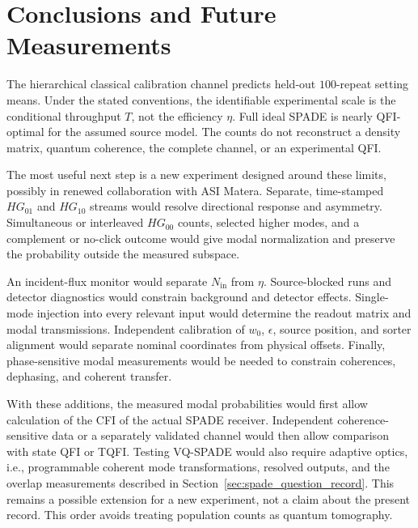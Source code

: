 \section{Conclusions and Future Measurements}
\label{sec:spade_conclusions}

\begin{remark}
    The hierarchical classical calibration channel predicts held-out $100$-repeat setting means.  Under the stated conventions, the identifiable experimental scale is the conditional throughput $T$, not the efficiency $\eta$.  Full ideal SPADE is nearly QFI-optimal for the assumed source model.  The counts do not reconstruct a density matrix, quantum coherence, the complete channel, or an experimental QFI.
\end{remark}

The most useful next step is a new experiment designed around these limits, possibly in renewed collaboration with ASI Matera.  Separate, time-stamped $HG_{01}$ and $HG_{10}$ streams would resolve directional response and asymmetry.  Simultaneous or interleaved $HG_{00}$ counts, selected higher modes, and a complement or no-click outcome would give modal normalization and preserve the probability outside the measured subspace.

An incident-flux monitor would separate $N_{\mathrm{in}}$ from $\eta$.  Source-blocked runs and detector diagnostics would constrain background and detector effects.  Single-mode injection into every relevant input would determine the readout matrix and modal transmissions.  Independent calibration of $w_0$, $\epsilon$, source position, and sorter alignment would separate nominal coordinates from physical offsets.  Finally, phase-sensitive modal measurements would be needed to constrain coherences, dephasing, and coherent transfer.

With these additions, the measured modal probabilities would first allow calculation of the CFI of the actual SPADE receiver.  Independent coherence-sensitive data or a separately validated channel would then allow comparison with state QFI or TQFI.  Testing VQ-SPADE would also require adaptive optics, i.e., programmable coherent mode transformations, resolved outputs, and the overlap measurements described in Section~\ref{sec:spade_question_record}.  This remains a possible extension for a new experiment, not a claim about the present record.  This order avoids treating population counts as quantum tomography.
